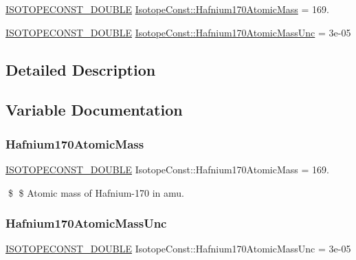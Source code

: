 \begin{DoxyCompactItemize}
\item 
\mbox{\hyperlink{group___isotope_const-_macros_ga8f45a7272ce02c0b4c65c44636ed719a}{I\+S\+O\+T\+O\+P\+E\+C\+O\+N\+S\+T\+\_\+\+D\+O\+U\+B\+LE}} \mbox{\hyperlink{group___isotope_const-_hafnium-_hf170_ga27df3338a6a1995f6bf27b294e8cc8b1}{Isotope\+Const\+::\+Hafnium170\+Atomic\+Mass}} = 169.
\item 
\mbox{\hyperlink{group___isotope_const-_macros_ga8f45a7272ce02c0b4c65c44636ed719a}{I\+S\+O\+T\+O\+P\+E\+C\+O\+N\+S\+T\+\_\+\+D\+O\+U\+B\+LE}} \mbox{\hyperlink{group___isotope_const-_hafnium-_hf170_ga0993a55c5aae9bbe42257a58aed349b3}{Isotope\+Const\+::\+Hafnium170\+Atomic\+Mass\+Unc}} = 3e-\/05
\end{DoxyCompactItemize}


\subsection{Detailed Description}


\subsection{Variable Documentation}
\mbox{\label{group___isotope_const-_hafnium-_hf170_ga27df3338a6a1995f6bf27b294e8cc8b1}} 
\subsubsection{\texorpdfstring{Hafnium170\+Atomic\+Mass}{Hafnium170AtomicMass}}
{\footnotesize\ttfamily \mbox{\hyperlink{group___isotope_const-_macros_ga8f45a7272ce02c0b4c65c44636ed719a}{I\+S\+O\+T\+O\+P\+E\+C\+O\+N\+S\+T\+\_\+\+D\+O\+U\+B\+LE}} Isotope\+Const\+::\+Hafnium170\+Atomic\+Mass = 169.}

\$ \$ Atomic mass of Hafnium-\/170 in amu. \mbox{\label{group___isotope_const-_hafnium-_hf170_ga0993a55c5aae9bbe42257a58aed349b3}} 
\subsubsection{\texorpdfstring{Hafnium170\+Atomic\+Mass\+Unc}{Hafnium170AtomicMassUnc}}
{\footnotesize\ttfamily \mbox{\hyperlink{group___isotope_const-_macros_ga8f45a7272ce02c0b4c65c44636ed719a}{I\+S\+O\+T\+O\+P\+E\+C\+O\+N\+S\+T\+\_\+\+D\+O\+U\+B\+LE}} Isotope\+Const\+::\+Hafnium170\+Atomic\+Mass\+Unc = 3e-\/05}

